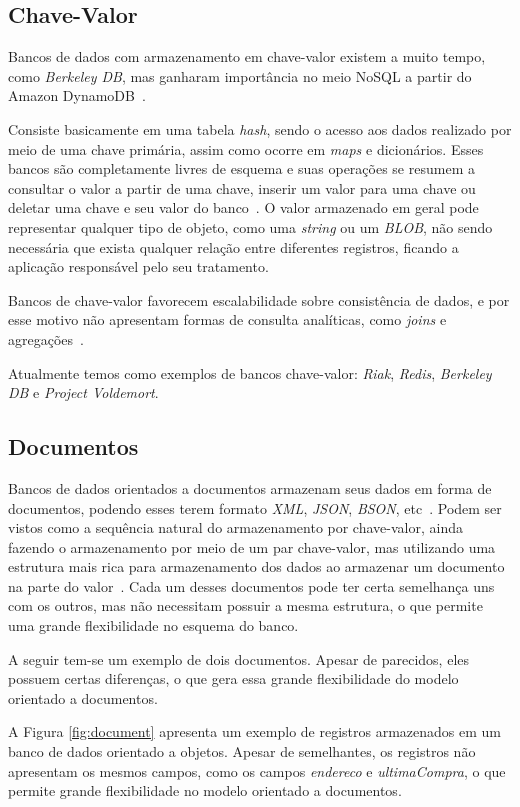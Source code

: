 \subsection*{Chave-Valor}
Bancos de dados com armazenamento em chave-valor existem a muito tempo, como \emph{Berkeley DB}, mas ganharam importância no meio NoSQL a partir do Amazon DynamoDB~\cite{chrisnosql}.

Consiste basicamente em uma tabela \emph{hash}, sendo o acesso aos dados realizado por meio de uma chave primária, assim como ocorre em \emph{maps} e dicionários.  Esses bancos são completamente livres de esquema e suas operações se resumem a consultar o valor a partir de uma chave, inserir um valor para uma chave ou deletar uma chave e seu valor do banco~\cite{nosqleval}. O valor armazenado em geral pode representar qualquer tipo de objeto, como uma \emph{string} ou um \emph{BLOB}, não sendo necessária que exista qualquer relação entre diferentes registros, ficando a aplicação responsável pelo seu tratamento. 

Bancos de chave-valor favorecem escalabilidade sobre consistência de dados, e por esse motivo não apresentam formas de consulta analíticas, como \emph{joins} e agregações~\cite{chrisnosql}.

Atualmente temos como exemplos de bancos chave-valor: \emph{Riak}, \emph{Redis}, \emph{Berkeley DB} e \emph{Project Voldemort}.

\subsection*{Documentos}
Bancos de dados orientados a documentos armazenam seus dados em forma de documentos, podendo esses terem formato \emph{XML}, \emph{JSON}, \emph{BSON}, etc~\cite{pramod}. Podem ser vistos como a sequência natural do armazenamento por chave-valor, ainda fazendo o armazenamento por meio de um par chave-valor, mas utilizando uma estrutura mais rica para armazenamento dos dados ao armazenar um documento na parte do valor~\cite{chrisnosql}. Cada um desses documentos pode ter certa semelhança uns com os outros, mas não necessitam possuir a mesma estrutura, o que permite uma grande flexibilidade no esquema do banco.

A seguir tem-se um exemplo de dois documentos. Apesar de parecidos, eles possuem certas diferenças, o que gera essa grande flexibilidade do modelo orientado a documentos.

A Figura \ref{fig:document} apresenta um exemplo de registros armazenados em um banco de dados orientado a objetos. Apesar de semelhantes, os registros não apresentam os mesmos campos, como os campos \emph{endereco} e \emph{ultimaCompra}, o que permite grande flexibilidade no modelo orientado a documentos. 

